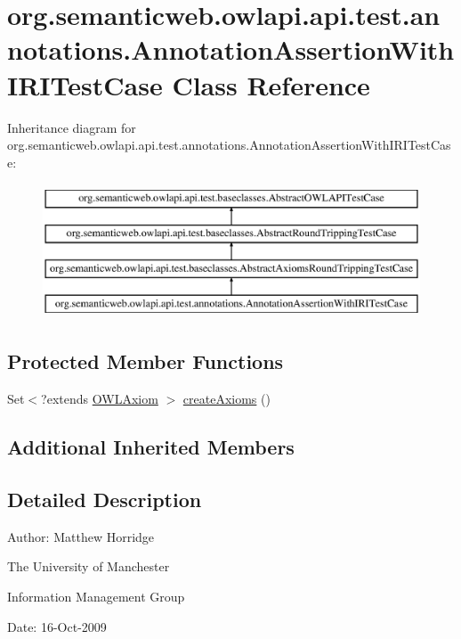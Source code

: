\hypertarget{classorg_1_1semanticweb_1_1owlapi_1_1api_1_1test_1_1annotations_1_1_annotation_assertion_with_i_r_i_test_case}{\section{org.\-semanticweb.\-owlapi.\-api.\-test.\-annotations.\-Annotation\-Assertion\-With\-I\-R\-I\-Test\-Case Class Reference}
\label{classorg_1_1semanticweb_1_1owlapi_1_1api_1_1test_1_1annotations_1_1_annotation_assertion_with_i_r_i_test_case}
}
Inheritance diagram for org.\-semanticweb.\-owlapi.\-api.\-test.\-annotations.\-Annotation\-Assertion\-With\-I\-R\-I\-Test\-Case\-:\begin{figure}[H]
\begin{center}
\leavevmode
\includegraphics[height=4.000000cm]{classorg_1_1semanticweb_1_1owlapi_1_1api_1_1test_1_1annotations_1_1_annotation_assertion_with_i_r_i_test_case}
\end{center}
\end{figure}
\subsection*{Protected Member Functions}
\begin{DoxyCompactItemize}
\item 
Set$<$?extends \hyperlink{interfaceorg_1_1semanticweb_1_1owlapi_1_1model_1_1_o_w_l_axiom}{O\-W\-L\-Axiom} $>$ \hyperlink{classorg_1_1semanticweb_1_1owlapi_1_1api_1_1test_1_1annotations_1_1_annotation_assertion_with_i_r_i_test_case_aef6ade1278e2df6380236c0e9409e189}{create\-Axioms} ()
\end{DoxyCompactItemize}
\subsection*{Additional Inherited Members}


\subsection{Detailed Description}
Author\-: Matthew Horridge\par
 The University of Manchester\par
 Information Management Group\par
 Date\-: 16-\/\-Oct-\/2009 

